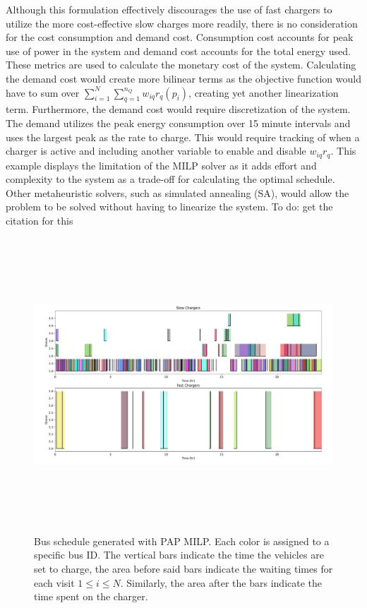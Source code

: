 \documentclass[letterpaper, 10pt, conference]{IEEEtran}
\newcommand{\TODO}[1]{{\color{green} To do: #1}}                                %
\begin{document}
Although this formulation effectively discourages the use of fast chargers to utilize the more cost-effective slow
charges more readily, there is no consideration for the cost consumption and demand cost. Consumption cost accounts for
peak use of power in the system and demand cost accounts for the total energy used. These metrics are used to calculate
the monetary cost of the system. Calculating the demand cost would create more bilinear terms as the objective function
would have to sum over $\sum_{i=1}^N \sum_{q=1}^{n_Q} w_{iq}{r_q}(p_i)$, creating yet another linearization term. Furthermore, the
demand cost would require discretization of the system. The demand utilizes the peak energy consumption over 15 minute
intervals and uses the largest peak as the rate to charge. This would require tracking of when a charger is active and
including another variable to enable and disable $w_{iq}r_q$. This example displays the limitation of the MILP solver as
it adds effort and complexity to the system as a trade-off for calculating the optimal schedule. Other metaheuristic
solvers, such as simulated annealing (SA), would allow the problem to be solved without having to linearize the system.
\TODO{get the citation for this}

\begin{figure}[ht]
	\centering
	\includegraphics[trim=1in 0.5in 1in 0.5in, width=\linewidth, height=11cm]{schedule.pdf}
	\caption{Bus schedule generated with PAP MILP. Each color is assigned to a specific bus ID. The vertical bars indicate the time the vehicles are set to charge, the area before said bars indicate the waiting times for each visit $1 \leq i \leq N$. Similarly, the area after the bars indicate the time spent on the charger.}
	\label{fig:schedule}
\end{figure}
\end{document}
